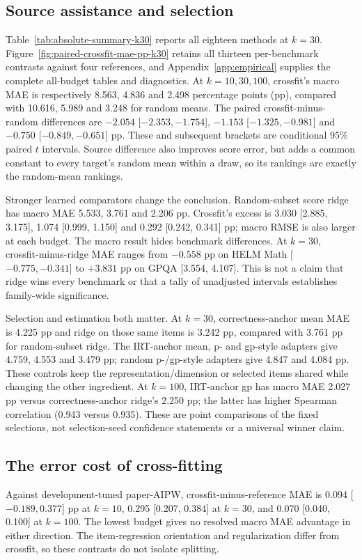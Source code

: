 \documentclass{article}
\begin{document}

\subsection{Source assistance and selection}
Table~\ref{tab:absolute-summary-k30} reports all eighteen methods at $k=30$. Figure~\ref{fig:paired-crossfit-mae-pp-k30} retains all thirteen per-benchmark contrasts against four references, and Appendix~\ref{app:empirical} supplies the complete all-budget tables and diagnostics.
At $k=10,30,100$, crossfit's macro MAE is respectively 8.563, 4.836 and 2.498 percentage points (pp), compared with 10.616, 5.989 and 3.248 for random means. The paired crossfit-minus-random differences are $-2.054$ [$-2.353,-1.754$], $-1.153$ [$-1.325,-0.981$] and $-0.750$ [$-0.849,-0.651$] pp. These and subsequent brackets are conditional 95\% paired $t$ intervals. Source difference also improves score error, but adds a common constant to every target's random mean within a draw, so its rankings are exactly the random-mean rankings.

Stronger learned comparators change the conclusion. Random-subset score ridge has macro MAE 5.533, 3.761 and 2.206 pp. Crossfit's excess is 3.030 [2.885, 3.175], 1.074 [0.999, 1.150] and 0.292 [0.242, 0.341] pp; macro RMSE is also larger at each budget. The macro result hides benchmark differences. At $k=30$, crossfit-minus-ridge MAE ranges from $-0.558$ pp on HELM Math [$-0.775,-0.341$] to $+3.831$ pp on GPQA [3.554, 4.107]. This is not a claim that ridge wins every benchmark or that a tally of unadjusted intervals establishes family-wide significance.

Selection and estimation both matter. At $k=30$, correctness-anchor mean MAE is 4.225 pp and ridge on those same items is 3.242 pp, compared with 3.761 pp for random-subset ridge. The IRT-anchor mean, p- and gp-style adapters give 4.759, 4.553 and 3.479 pp; random p-/gp-style adapters give 4.847 and 4.084 pp. These controls keep the representation/dimension or selected items shared while changing the other ingredient. At $k=100$, IRT-anchor gp has macro MAE 2.027 pp versus correctness-anchor ridge's 2.250 pp; the latter has higher Spearman correlation (0.943 versus 0.935). These are point comparisons of the fixed selections, not selection-seed confidence statements or a universal winner claim.

\subsection{The error cost of cross-fitting}
Against development-tuned paper-AIPW, crossfit-minus-reference MAE is 0.094 [$-0.189,0.377$] pp at $k=10$, 0.295 [0.207, 0.384] at $k=30$, and 0.070 [0.040, 0.100] at $k=100$. The lowest budget gives no resolved macro MAE advantage in either direction. The item-regression orientation and regularization differ from crossfit, so these contrasts do not isolate splitting.
\end{document}
